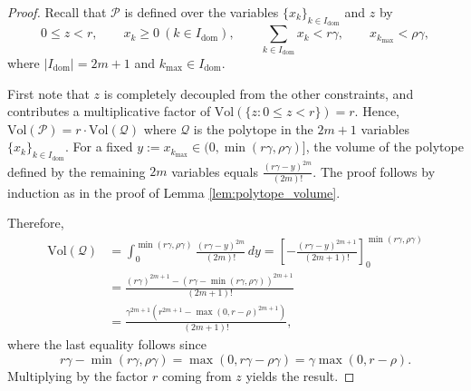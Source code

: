 \documentclass[11pt]{article}
\theoremstyle{plain}
\theoremstyle{definition}
\begin{document}
\begin{proof}
Recall that $\mathcal{P}$ is defined over the variables $\{x_k\}_{k\in I_{\mathrm{dom}}}$ and $z$ by
\[
0 \le z < r,\qquad x_k \ge 0\ (k\in I_{\mathrm{dom}}),\qquad
\sum_{k\in I_{\mathrm{dom}}} x_k < r\gamma,\qquad
x_{k_{\max}} < \rho\gamma,
\]
where $|I_{\mathrm{dom}}|=2m+1$ and $k_{\max}\in I_{\mathrm{dom}}$.

First note that $z$ is completely decoupled from the other constraints, and contributes a multiplicative factor of
$
\mathrm{Vol}(\{z: 0\le z<r\}) = r.
$
Hence,
$
\mathrm{Vol}(\mathcal{P}) = r \cdot \mathrm{Vol}(\mathcal{Q})
$
where $\mathcal{Q}$ is the polytope in the $2m+1$ variables $\{x_k\}_{k\in I_{\mathrm{dom}}}$.
For a fixed  $y := x_{k_{\max}}\in (0, \min(r\gamma,\rho\gamma)]$, the volume of the polytope defined by the remaining $2m$ variables 
equals $\frac{(r\gamma-y)^{2m}}{(2m)!}$. The proof follows by induction as in the proof of Lemma \ref{lem:polytope_volume}. 


Therefore,
\begin{align*}
\mathrm{Vol}(\mathcal{Q})
&=
\int_{0}^{\min(r\gamma,\rho\gamma)} \frac{(r\gamma-y)^{2m}}{(2m)!}\,dy
=\left[ -\frac{(r\gamma-y)^{2m+1}}{(2m+1)!} \right]_{0}^{\min(r\gamma,\rho\gamma)}\\
&
=
\frac{(r\gamma)^{2m+1} - (r\gamma-\min(r\gamma,\rho\gamma))^{2m+1}}{(2m+1)!}\\
&=\frac{\gamma^{2m+1}\left(r^{2m+1}-\max(0,r-\rho)^{2m+1}\right)}{(2m+1)!},
\end{align*}
where the last equality follows since 
\[
r\gamma-\min(r\gamma,\rho\gamma)=\max(0,r\gamma-\rho\gamma)=\gamma\max(0,r-\rho).
\]
Multiplying by the factor $r$ coming from $z$ yields
the result.
\end{proof}



 
\end{document}
